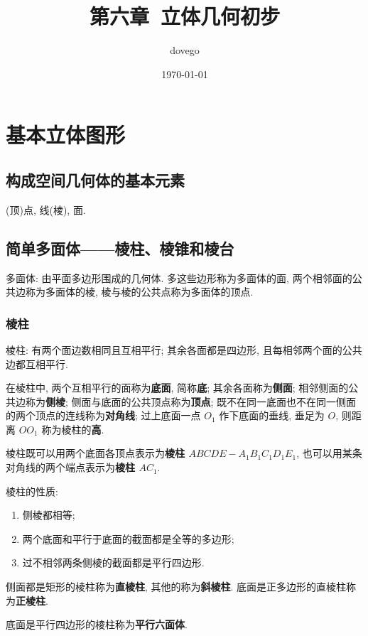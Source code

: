 \documentclass[titlepage]{ctexart}
\title{第六章~立体几何初步}
\author{dovego}
\date{\today}
\begin{document}
\maketitle


\section{基本立体图形}

\subsection{构成空间几何体的基本元素}

(顶)点, 线(棱), 面.

\subsection{简单多面体——棱柱、棱锥和棱台}

多面体: 由平面多边形围成的几何体. 多这些边形称为多面体的面, 两个相邻面的公共边称为多面体的棱, 棱与棱的公共点称为多面体的顶点.

\subsubsection{棱柱}

棱柱: 有两个面边数相同且互相平行; 其余各面都是四边形, 且每相邻两个面的公共边都互相平行. 

在棱柱中, 两个互相平行的面称为\textbf{底面}, 简称\textbf{底}; 其余各面称为\textbf{侧面}; 相邻侧面的公共边称为\textbf{侧棱};
侧面与底面的公共顶点称为\textbf{顶点}; 既不在同一底面也不在同一侧面的两个顶点的连线称为\textbf{对角线}; 
过上底面一点 $O_1$ 作下底面的垂线, 垂足为 $O$, 则距离 $OO_1$ 称为棱柱的\textbf{高}.

棱柱既可以用两个底面各顶点表示为\textbf{棱柱 $ABCDE-A_1B_1C_1D_1E_1$}, 也可以用某条对角线的两个端点表示为\textbf{棱柱 $AC_1$}.

棱柱的性质: 
\begin{enumerate}[(1)]
    \item 侧棱都相等;
    \item 两个底面和平行于底面的截面都是全等的多边形;
    \item 过不相邻两条侧棱的截面都是平行四边形.
\end{enumerate}

侧面都是矩形的棱柱称为\textbf{直棱柱}, 其他的称为\textbf{斜棱柱}. 底面是正多边形的直棱柱称为\textbf{正棱柱}.

底面是平行四边形的棱柱称为\textbf{平行六面体}.
\end{document}
